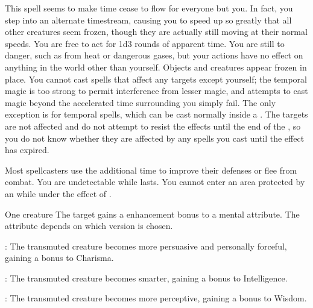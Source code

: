 \begin{spellheader}
\end{spellheader}
\begin{spelleffects}
    \spelleffect This spell seems to make time cease to flow for everyone but you. In fact, you step into an alternate timestream, causing you to speed up so greatly that all other creatures seem frozen, though they are actually still moving at their normal speeds. You are free to act for 1d3 rounds of apparent time. You are still \vulnerable to danger, such as from heat or dangerous gases, but your actions have no effect on anything in the world other than yourself. Objects and creatures appear frozen in place. You cannot cast spells that affect any targets except yourself; the temporal magic is too strong to permit interference from lesser magic, and attempts to cast magic beyond the accelerated time surrounding you simply fail. The only exception is for temporal spells, which can be cast normally inside a . The targets are not affected and do not attempt to resist the effects until the end of the , so you do not know whether they are affected by any spells you cast until the effect has expired.
\end{spelleffects}
\begin{spellfooter}
    \spellnotes Most spellcasters use the additional time to improve their defenses or flee from combat. You are undetectable while  lasts. You cannot enter an area protected by an  while under the effect of .
\end{spellfooter}

\begin{spellheader}
    \spellrng{\rngtouch}
    \spelldur{\durshort}
\end{spellheader}
\begin{spelleffects}
    \begin{spelltarget}{One creature}
        \spelleffect The target gains a  enhancement bonus to a mental attribute. The attribute depends on which version is chosen.
        \par {}: The transmuted creature becomes more persuasive and personally forceful, gaining a bonus to Charisma.
        \par {}: The transmuted creature becomes smarter, gaining a bonus to Intelligence.
        \par {}: The transmuted creature becomes more perceptive, gaining a bonus to Wisdom.
    \end{spelltarget}
\end{spelleffects}

